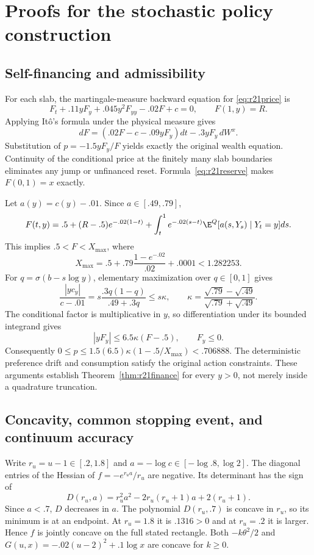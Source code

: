 \section{Proofs for the stochastic policy construction}\label{app:r21proofs}
\subsection{Self-financing and admissibility}
For each slab, the martingale-measure backward equation for \eqref{eq:r21price} is
\[
 F_t+.11yF_y+.045y^2F_{yy}-.02F+c=0,
 \qquad F(1,y)=R.
\]
Applying It\^o's formula under the physical measure gives
\[
 dF=(.02F-c-.09yF_y)dt-.3yF_y\,dW^x.
\]
Substitution of $p=-1.5yF_y/F$ yields exactly the original wealth equation. Continuity of the conditional price at the finitely many slab boundaries eliminates any jump or unfinanced reset. Formula~\eqref{eq:r21reserve} makes $F(0,1)=x$ exactly.

Let $a(y)=c(y)-.01$. Since $a\in[.49,.79]$,
\[
 F(t,y)=.5+(R-.5)e^{-.02(1-t)}+
 \int_t^1 e^{-.02(s-t)}\E^Q[a(s,Y_s)\mid Y_t=y]ds.
\]
This implies $.5<F<X_{\max}$, where
\[
 X_{\max}=.5+.79\frac{1-e^{-.02}}{.02}+.0001<1.282253.
\]
For $q=\sigma(b-s\log y)$, elementary maximization over $q\in[0,1]$ gives
\[
 \frac{|yc_y|}{c-.01}=s\frac{.3q(1-q)}{.49+.3q}
 \leq s\kappa,\qquad
 \kappa=\frac{\sqrt{.79}-\sqrt{.49}}{\sqrt{.79}+\sqrt{.49}}.
\]
The conditional factor is multiplicative in $y$, so differentiation under its bounded integrand gives
\[
 |yF_y|\leq6.5\kappa(F-.5),\qquad F_y\leq0.
\]
Consequently $0\leq p\leq1.5(6.5)\kappa(1-.5/X_{\max})<.706888$. The deterministic preference drift and consumption satisfy the original action constraints. These arguments establish Theorem~\ref{thm:r21finance} for every $y>0$, not merely inside a quadrature truncation.

\subsection{Concavity, common stopping event, and continuum accuracy}
Write $r_u=u-1\in[.2,1.8]$ and $a=-\log c\in[-\log .8,\log2]$. The diagonal entries of the Hessian of $f=-e^{r_ua}/r_u$ are negative. Its determinant has the sign of
\[
 D(r_u,a)=r_u^2a^2-2r_u(r_u+1)a+2(r_u+1).
\]
Since $a<.7$, $D$ decreases in $a$. The polynomial $D(r_u,.7)$ is concave in $r_u$, so its minimum is at an endpoint. At $r_u=1.8$ it is $.1316>0$ and at $r_u=.2$ it is larger. Hence $f$ is jointly concave on the full stated rectangle. Both $-k\theta^2/2$ and $G(u,x)=-.02(u-2)^2+.1\log x$ are concave for $k\geq0$.

